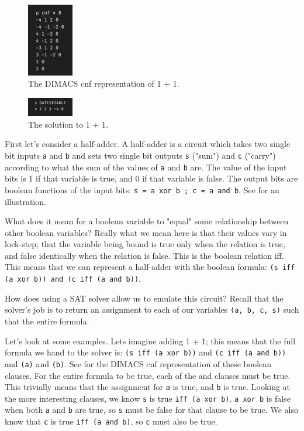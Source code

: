 \begin{figure}[t]
    \centerline{\includegraphics[origin=c,width=2cm]{fig_one_plus_one_cnf}}
    \caption{The DIMACS cnf representation of 1 + 1.}%
    \label{fig:one_plus_one_cnf}%
\end{figure}

\begin{figure}[t]
    \centerline{\includegraphics[origin=c,width=2cm]{fig_one_plus_one_sol}}
    \caption{The solution to 1 + 1.}%
    \label{fig:one_plus_one_sol}%
\end{figure}

First let's consider a half-adder. A half-adder is a circuit which takes two single bit inputs \texttt{a} and \texttt{b} and sets two single bit outputs \texttt{s} ("sum") and \texttt{c} ("carry") according to what the sum of the values of \texttt{a} and \texttt{b} are. The value of the input bits is 1 if that variable is true, and 0 if that variable is false. The output bits are boolean functions of the input bits: \texttt{s = a xor b ; c = a and b}. See  for an illustration.

What does it mean for a boolean variable to "equal" some relationship between other boolean variables? Really what we mean here is that their values vary in lock-step; that the variable being bound is true only when the relation is true, and false identically when the relation is false. This is the boolean relation iff. This means that we can represent a half-adder with the boolean formula:
\texttt{(s iff (a xor b)) and (c iff (a and b))}.

How does using a SAT solver allow us to emulate this circuit? Recall that the solver's job is to return an assignment to each of our variables \texttt{(a, b, c, s)} such that the entire formula.

Let's look at some examples. Lets imagine adding 1 + 1; this means that the full formula we hand to the solver is:
\texttt{(s iff (a xor b))} and \texttt{(c iff (a and b))} and \texttt{(a)} and \texttt{(b)}. See  for the DIMACS cnf representation of these boolean clauses.
For the entire formula to be true, each of the and clauses must be true. This trivially means that the assignment for \texttt{a} is true, and \texttt{b} is true. Looking at the more interesting clauses, we know \texttt{s} is true \texttt{iff (a xor b)}. \texttt{a xor b} is false when both \texttt{a} and \texttt{b} are true, so \texttt{s} must be false for that clause to be true. We also know that \texttt{c} is true \texttt{iff (a and b)}, so \texttt{c} must also be true.

